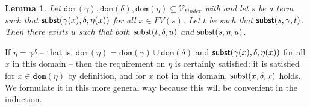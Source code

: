 \documentclass{lmcs}
\theoremstyle{theorem}\newtheorem{theorem}{Theorem}
\theoremstyle{theorem}\newtheorem{lemma}[theorem]{Lemma}
\theoremstyle{theorem}\newtheorem{corollary}[theorem]{Corollary}
\theoremstyle{definition}\newtheorem{definition}[theorem]{Definition}
\theoremstyle{definition}\newtheorem{example}[theorem]{Example}
\newcommand{\Vbound}{\mathcal{V}_{\mathit{binder}}}
\newcommand{\FV}{\mathit{FV}}
\newcommand{\domain}{\mathtt{dom}}
\newcommand{\avar}{x}
\begin{document}
\begin{lemma}\label{lem:combinesubst:allbound}
Let $\domain(\gamma),\domain(\delta),\domain(\eta) \subseteq \Vbound$ with
and let $s$ be a term such that
$\subrel{\gamma(\avar),\delta,\eta(\avar)}$ for all $\avar \in \FV(s)$.
Let $t$ be such that $\mathsf{subst}(s,\gamma,t)$.
Then there exists $u$ such that both $\mathsf{subst}(t,\delta,u)$ and $\mathsf{subst}(s,\eta,u)$.
\end{lemma}

If $\eta = \gamma\delta$ -- that is, $\domain(\eta) = \domain(\gamma) \cup \domain(\delta)$ and
$\subrel{\gamma(\avar),\delta,\eta(\avar)}$ for all $\avar$ in this domain -- then the
requirement on $\eta$ is certainly satisfied: it is satisfied for $\avar \in \domain(\eta)$ by
definition, and for $\avar$ not in this domain, $\subrel{\avar,\delta,\avar}$ holds.
We formulate it in this more general way because this will be convenient in the induction.
\end{document}
